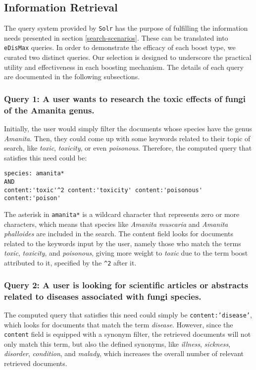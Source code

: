 \subsection{Information Retrieval}

The query system provided by \texttt{Solr} has the purpose of fulfilling the information needs presented in section \ref{search-scenarios}. These can be translated into \texttt{eDisMax} queries. In order to demonstrate the efficacy of each boost type, we curated two distinct queries. Our selection is designed to underscore the practical utility and effectiveness in each boosting mechanism. The details of each query are documented in the following subsections. 

\subsubsection{\textbf{Query 1:} A user wants to research the toxic effects of fungi of the Amanita genus.} Initially, the user would simply filter the documents whose species have the genus \textit{Amanita}. Then, they could come up with some keywords related to their topic of search, like \textit{toxic}, \textit{toxicity}, or even \textit{poisonous}. Therefore, the computed query that satisfies this need could be:
\begin{verbatim}
species: amanita* 
AND 
content:'toxic'^2 content:'toxicity' content:'poisonous' content:'poison'
\end{verbatim}

The asterisk in \texttt{amanita*} is a wildcard character that represents zero or more characters, which means that species like \textit{Amanita muscaria} and \textit{Amanita phalloides} are included in the search. The content field looks for documents related to the keywords input by the user, namely those who match the terms \textit{toxic}, \textit{toxicity}, and \textit{poisonous}, giving more weight to \textit{toxic} due to the term boost attributed to it, specified by the \texttt{\^{}2} after it.

\subsubsection{\textbf{Query 2:} A user is looking for scientific articles or abstracts related to diseases associated with fungi species.} The computed query that satisfies this need could simply be \texttt{content:'disease'}, which looks for documents that match the term \textit{disease}. However, since the \texttt{content} field is equipped with a synonym filter, the retrieved documents will not only match this term, but also the defined synonyms, like \textit{illness}, \textit{sickness}, \textit{disorder}, \textit{condition}, and \textit{malady}, which increases the overall number of relevant retrieved documents.
